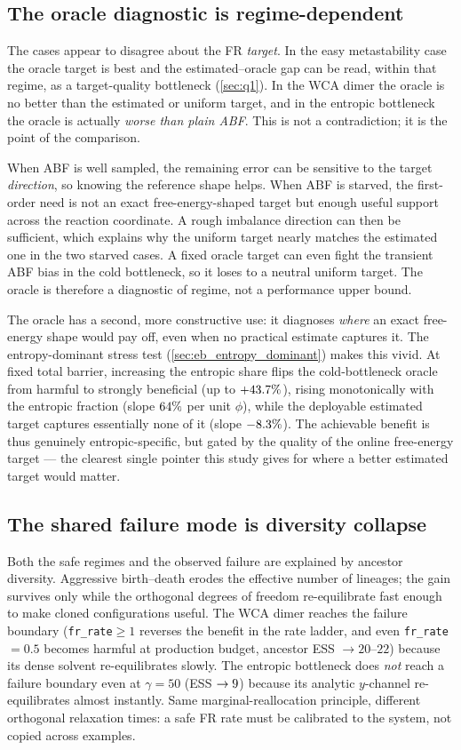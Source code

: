 \subsection{The oracle diagnostic is regime-dependent}
The cases appear to disagree about the FR \emph{target}. In the easy metastability
case the oracle target is best and the estimated--oracle gap can be read, within
that regime, as a target-quality bottleneck (\cref{sec:q1}). In the WCA dimer the
oracle is no better than the estimated or uniform target, and in the entropic
bottleneck the oracle is actually \emph{worse than plain ABF}. This is not a
contradiction; it is the point of the comparison.

When ABF is well sampled, the remaining error can be sensitive to the target
\emph{direction}, so knowing the reference shape helps. When ABF is starved, the
first-order need is not an exact free-energy-shaped target but enough useful
support across the reaction coordinate. A rough imbalance direction can then be
sufficient, which explains why the uniform target nearly matches the estimated one
in the two starved cases. A fixed oracle target can even fight the transient ABF
bias in the cold bottleneck, so it loses to a neutral uniform target. The oracle is
therefore a diagnostic of regime, not a performance upper bound.

The oracle has a second, more constructive use: it diagnoses \emph{where} an exact
free-energy shape would pay off, even when no practical estimate captures it. The
entropy-dominant stress test (\cref{sec:eb_entropy_dominant}) makes this vivid. At
fixed total barrier, increasing the entropic share flips the cold-bottleneck
oracle from harmful to strongly beneficial (up to $+43.7\%$), rising
monotonically with the entropic fraction (slope $64\%$ per unit
$\phi$), while the deployable estimated target captures essentially none of it
(slope $-8.3\%$). The achievable benefit is thus genuinely
entropic-specific, but gated by the quality of the online free-energy target ---
the clearest single pointer this study gives for where a better estimated target
would matter.

\subsection{The shared failure mode is diversity collapse}
Both the safe regimes and the observed failure are explained by ancestor
diversity. Aggressive birth--death erodes the effective number of lineages; the
gain survives only while the orthogonal degrees of freedom re-equilibrate fast
enough to make cloned configurations useful. The WCA dimer reaches the failure
boundary (\texttt{fr\_rate}$\ge1$ reverses the benefit in the rate ladder, and even
\texttt{fr\_rate}$=0.5$ becomes harmful at production budget, ancestor ESS
$\to\!20$--$22$) because its dense solvent re-equilibrates slowly. The entropic
bottleneck does \emph{not} reach a failure boundary even at $\gamma=50$ (ESS
$\to9$) because its analytic $y$-channel re-equilibrates almost instantly.
Same marginal-reallocation principle, different orthogonal relaxation times: a
safe FR rate must be calibrated to the system, not copied across examples.
